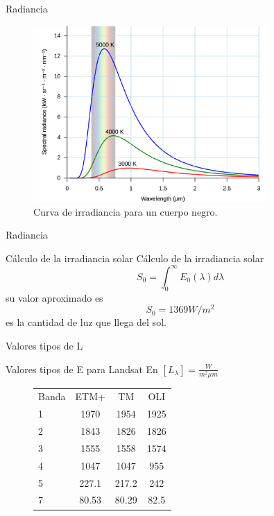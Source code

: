 \documentclass[handout]{beamer}
\begin{document}
\begin{frame}{Radiancia}
  \begin{figure}
  \centering
  \includegraphics[width=0.8\textwidth]{imagenes/blackbody.png}
  \caption{Curva de irradiancia para un cuerpo negro.}
  \end{figure}
\end{frame}

\begin{frame}{Radiancia}
  \begin{block}{C\'alculo de la irradiancia solar}
    C\'alculo de la irradiancia solar
    $$S_0 = \int_0^\infty E_0(\lambda) d\lambda$$
    su valor aproximado es
    $$ S_0 = 1369 W/m^2$$
    \pause es la cantidad de luz que llega del sol.
  \end{block}
\end{frame}

\begin{frame}{Valores tipos de L}
  \begin{exampleblock}{Valores tipos de E para Landsat}
    En $[L_{\lambda}] = \frac{W}{m^2 \mu m}$
    \begin{figure}
      \begin{tabular}{l c c c}
          Banda & ETM+  & TM    &  OLI \\
          1     & 1970  & 1954  & 1925 \\
          2     & 1843  & 1826  & 1826 \\
          3     & 1555  & 1558  & 1574 \\
          4     & 1047  & 1047  & 955  \\
          5     & 227.1 & 217.2 & 242 \\
          7     & 80.53 & 80.29 & 82.5\\
      \end{tabular}
    \end{figure}
  \end{exampleblock}
\end{frame}
\end{document}
